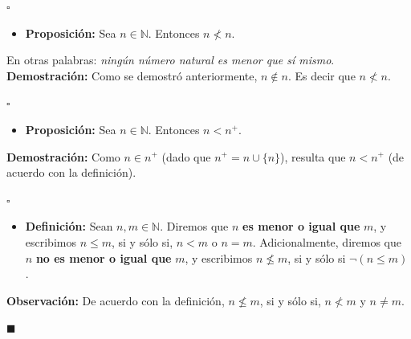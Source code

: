 \documentclass[10 pt]{article}
\begin{document}
\begin{flushright}
    $\square$
\end{flushright}

\begin{itemize}
    \item \Large{\textbf{Proposición:} Sea $n \in \mathbb N$. Entonces $n \nless n$.} \\
\end{itemize}

\Large{En otras palabras: \textit{ningún número natural es menor que sí mismo}.} \\

\Large{\textbf{Demostración:} Como se demostró anteriormente, $n \notin n$. Es decir que $n \nless n$.} \\

\begin{flushright}
    $\square$
\end{flushright}

\begin{itemize}
    \item \Large{\textbf{Proposición:} Sea $n \in \mathbb N$. Entonces $n<n^+$.} \\
\end{itemize}

\Large{\textbf{Demostración:} Como $n \in n^+$ (dado que $n^+=n \cup \{n\}$), resulta que $n<n^+$ (de acuerdo con la definición).} \\

\begin{flushright}
    $\square$
\end{flushright}

\begin{itemize}
    \item \Large{\textbf{Definición:} Sean $n,m \in \mathbb N$. Diremos que $n$ \textbf{es menor o igual que} $m$, y escribimos \underline{$n \leq m$}, si y sólo si, $n<m$ o $n=m$. Adicionalmente, diremos que $n$ \textbf{no es menor o igual que} $m$, y escribimos \underline{$n \nleq m$}, si y sólo si $\neg (n \leq m)$.} \\
\end{itemize}

\Large{\textbf{Observación:} De acuerdo con la definición, $n \nleq m$, si y sólo si, $n \nless m$ y $n \neq m$.} \\

\begin{flushright}
    $\blacksquare$
\end{flushright}
\end{document}
